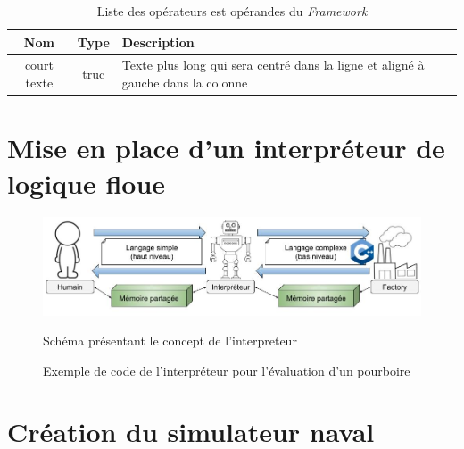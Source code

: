 \documentclass[a4paper,11pt]{article}
\begin{document}
    \begin{table}[h!]
        \caption{Liste des opérateurs est opérandes du \textit{Framework}}
        \label{tab:listing}

        \begin{center}
            \begin{tabular}{|c|c|M{4cm}|}
                \hline
                Nom & Type & Description \tabularnewline
                \hline
                court texte & truc & Texte plus long qui sera centré dans la ligne et aligné à gauche dans la colonne  \tabularnewline
                \hline
            \end{tabular}
        \end{center}
    \end{table}
    
    \section{Mise en place d'un interpréteur de logique floue}


    \begin{figure}[h!]
        \begin{center}
            \caption{Schéma présentant le concept de l'interpreteur}
            \includegraphics[scale=0.5]{assets/Interpreteur_Dessin.jpg}
            \label{fig:interpreterDessin}
        \end{center}
    \end{figure}

    \begin{figure}[h!]
        \begin{center}
            \caption{Exemple de code de l’interpréteur pour l’évaluation d'un pourboire}
            
            \label{fig:codeExemple}
        \end{center}
    \end{figure}

    \section{Création du simulateur naval}
\end{document}

